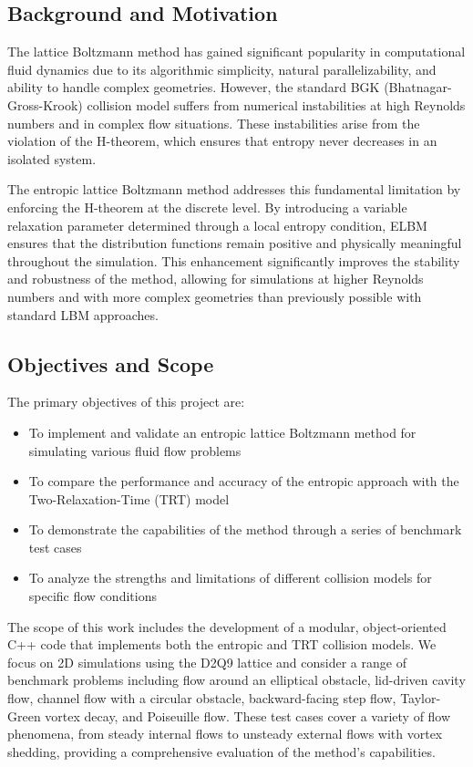 \documentclass[12pt,a4paper]{article}
\begin{document}
\subsection{Background and Motivation}
The lattice Boltzmann method has gained significant popularity in computational fluid dynamics due to its algorithmic simplicity, natural parallelizability, and ability to handle complex geometries. However, the standard BGK (Bhatnagar-Gross-Krook) collision model suffers from numerical instabilities at high Reynolds numbers and in complex flow situations. These instabilities arise from the violation of the H-theorem, which ensures that entropy never decreases in an isolated system.

The entropic lattice Boltzmann method addresses this fundamental limitation by enforcing the H-theorem at the discrete level. By introducing a variable relaxation parameter determined through a local entropy condition, ELBM ensures that the distribution functions remain positive and physically meaningful throughout the simulation. This enhancement significantly improves the stability and robustness of the method, allowing for simulations at higher Reynolds numbers and with more complex geometries than previously possible with standard LBM approaches.

\subsection{Objectives and Scope}
The primary objectives of this project are:
\begin{itemize}
    \item To implement and validate an entropic lattice Boltzmann method for simulating various fluid flow problems
    \item To compare the performance and accuracy of the entropic approach with the Two-Relaxation-Time (TRT) model
    \item To demonstrate the capabilities of the method through a series of benchmark test cases
    \item To analyze the strengths and limitations of different collision models for specific flow conditions
\end{itemize}

The scope of this work includes the development of a modular, object-oriented C++ code that implements both the entropic and TRT collision models. We focus on 2D simulations using the D2Q9 lattice and consider a range of benchmark problems including flow around an elliptical obstacle, lid-driven cavity flow, channel flow with a circular obstacle, backward-facing step flow, Taylor-Green vortex decay, and Poiseuille flow. These test cases cover a variety of flow phenomena, from steady internal flows to unsteady external flows with vortex shedding, providing a comprehensive evaluation of the method's capabilities.
\end{document}
